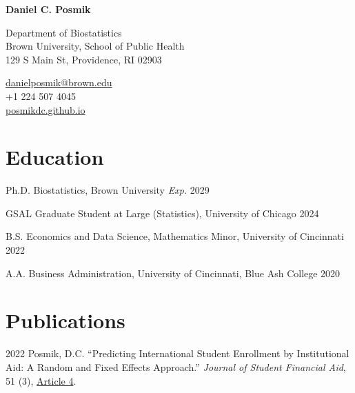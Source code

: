 \documentclass[11pt,letterpaper]{report}
\newcommand{\myname}{Daniel C. Posmik}
\newcommand{\namefont}[1]{{\normalfont\bfseries\Huge{#1}}}
\begin{document}
\raggedright{}

\namefont{\myname}

\vspace{1em}
\begin{minipage}[t]{0.700\textwidth}
Department of Biostatistics \\
Brown University, School of Public Health \\
129 S Main St, Providence, RI 02903 
\end{minipage}
\begin{minipage}[t]{0.295\textwidth}
\flushright{}
\href{mailto:daniel_posmik@brown.edu}{daniel{\textunderscore}posmik@brown.edu} \\
+1 224 507 4045 \\
\href{https://posmikdc.github.io}{posmikdc.github.io}
\end{minipage}

\section*{Education}

\begin{tablist}
\item[Ph.D.] \tab{}Biostatistics, Brown University \hfill \emph{Exp.} 2029
\item[GSAL]  \tab{}Graduate Student at Large (Statistics), University of Chicago \hfill 2024
\item[B.S.]  \tab{}Economics and Data Science, Mathematics Minor, University of Cincinnati \hfill 2022
\item[A.A.] \tab{}Business Administration, University of Cincinnati, Blue Ash College \hfill 2020
\end{tablist}

\section*{Publications}

\begin{tablist}
\item[2022] \tab{}Posmik, D.C. \enquote{Predicting International Student Enrollment by Institutional Aid: A Random and Fixed Effects Approach.} \textit{Journal of Student Financial Aid}, 51 (3), \href{https://ir.library.louisville.edu/jsfa/vol51/iss3/4}{Article 4}. 
\end{tablist}
\end{document}
